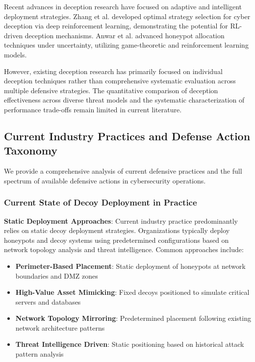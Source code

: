 \documentclass[12pt]{article}
\theoremstyle{definition}
\theoremstyle{plain}
\begin{document}
Recent advances in deception research have focused on adaptive and intelligent deployment strategies. Zhang et al. \cite{zhang2022optimal} developed optimal strategy selection for cyber deception via deep reinforcement learning, demonstrating the potential for RL-driven deception mechanisms. Anwar et al. \cite{anwar2022honeypot} advanced honeypot allocation techniques under uncertainty, utilizing game-theoretic and reinforcement learning models.

However, existing deception research has primarily focused on individual deception techniques rather than comprehensive systematic evaluation across multiple defensive strategies. The quantitative comparison of deception effectiveness across diverse threat models and the systematic characterization of performance trade-offs remain limited in current literature.

\subsection{Current Industry Practices and Defense Action Taxonomy}

We provide a comprehensive analysis of current defensive practices and the full spectrum of available defensive actions in cybersecurity operations.

\subsubsection{Current State of Decoy Deployment in Practice}

\textbf{Static Deployment Approaches}: Current industry practice predominantly relies on static decoy deployment strategies. Organizations typically deploy honeypots and decoy systems using predetermined configurations based on network topology analysis and threat intelligence. Common approaches include:

\begin{itemize}
\item \textbf{Perimeter-Based Placement}: Static deployment of honeypots at network boundaries and DMZ zones
\item \textbf{High-Value Asset Mimicking}: Fixed decoys positioned to simulate critical servers and databases  
\item \textbf{Network Topology Mirroring}: Predetermined placement following existing network architecture patterns
\item \textbf{Threat Intelligence Driven}: Static positioning based on historical attack pattern analysis
\end{itemize}
\end{document}
